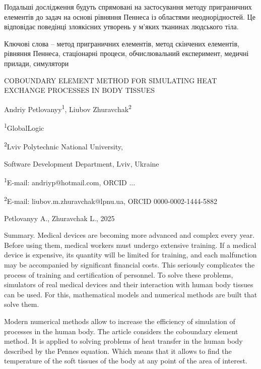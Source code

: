 \documentclass[a4paper,14pt]{extreport}
\begin{document}
Подальші дослідження будуть спрямовані на застосування методу приграничних елементів до задач на основі рівняння Пеннеса
із областями неоднорідностей. Це відповідає поведінці злоякісних утворень у м'яких тканинах людського тіла. 

Ключові слова -- метод приграничних елементів, метод скінчених елементів, рівняння Пеннеса, стаціонарні процеси, 
обчислювальний експеримент, медичні прилади, симулятори

\begin{center}
  COBOUNDARY ELEMENT METHOD FOR SIMULATING HEAT EXCHANGE PROCESSES IN BODY TISSUES
\end{center}

\begin{center}
  Andriy Petlovanyy\textsuperscript{1}, Liubov Zhuravchak\textsuperscript{2} 

  \textsuperscript{1}GlobalLogic

  \textsuperscript{2}Lviv Polytechnic National University, 

  Software Development Department, Lviv, Ukraine 
  
  \textsuperscript{1}E-mail: andriyp@hotmail.com, ORCID ...

  \textsuperscript{2}E-mail: liubov.m.zhuravchak@lpnu.ua, ORCID 0000-0002-1444-5882
  
\end{center}

\noindent\textcopyright Petlovanyy A.,  Zhuravchak L., 2025


Summary. Medical devices are becoming more advanced and complex every year. Before using them, medical workers must
undergo extensive training. If a medical device is expensive, its quantity will be limited for training, and each
malfunction may be accompanied by significant financial costs. This seriously complicates the process of training and
certification of personnel. To solve these problems, simulators of real medical devices and their interaction with human
body tissues can be used. For this, mathematical models and numerical methods are built that solve them.

Modern numerical methods allow to increase the efficiency of simulation of processes in the human body. The article
considers the coboundary element method. It is applied to solving problems of heat transfer in the human body described
by the Pennes equation. Which means that it allows to find the temperature of the soft tissues of the body at any point
of the area of interest.
\end{document}
